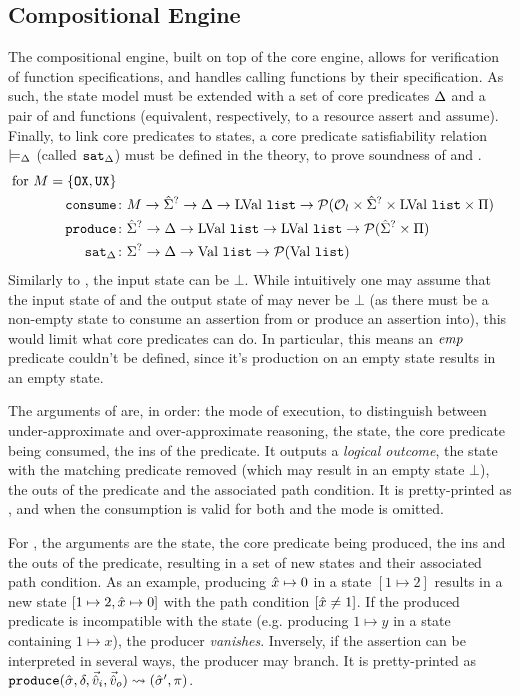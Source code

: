 \subsection{Compositional Engine}

The compositional engine, built on top of the core engine, allows for verification of function specifications, and handles calling functions by their specification. As such, the state model must be extended with a set of core predicates $\Delta$ and a pair of \consume{} and \produce{} functions (equivalent, respectively, to a resource assert and assume). Finally, to link core predicates to states, a core predicate satisfiability relation $\models_{\Delta}$ (called $\texttt{sat}_{\Delta}$) must be defined in the theory, to prove soundness of \consume{} and \produce.
\begin{align*}
	\text{for }M=\{\texttt{OX}, \texttt{UX}\}\\
	\texttt{consume} &\colon M\rightarrow \hat{\Sigma}^? \rightarrow \Delta \rightarrow \text{LVal}~\texttt{list} \rightarrow {\cal P}({\cal O}_l \times \hat{\Sigma}^? \times \text{LVal}~\texttt{list} \times \Pi) \\
	\texttt{produce} &\colon \hat{\Sigma}^? \rightarrow \Delta \rightarrow \text{LVal}~\texttt{list} \rightarrow \text{LVal}~\texttt{list} \rightarrow {\cal P}(\hat{\Sigma}^? \times \Pi)\\
	\texttt{sat}_\Delta &\colon\Sigma^? \rightarrow \Delta \rightarrow \text{Val}~\texttt{list} \rightarrow {\cal P}(\text{Val}~\texttt{list})
\end{align*}
Similarly to \execac, the input state can be $\bot$. While intuitively one may assume that the input state of \consume{} and the output state of \produce{} may never be $\bot$ (as there must be a non-empty state to consume an assertion from or produce an assertion into), this would limit what core predicates can do. In particular, this means an $\textit{emp}$ predicate couldn't be defined, since it's production on an empty state results in an empty state.

The arguments of \consume{} are, in order: the mode of execution, to distinguish between under-approximate and over-approximate reasoning, the state, the core predicate being consumed, the ins of the predicate. It outputs a \emph{logical outcome}, the state with the matching predicate removed (which may result in an empty state $\bot$), the outs of the predicate and the associated path condition. It is pretty-printed as , and when the consumption is valid for both \OX{} and \UX{} the mode is omitted.

For \produce{}, the arguments are the state, the core predicate being produced, the ins and the outs of the predicate, resulting in a set of new states and their associated path condition. As an example, producing $\hat{x} \mapsto 0$ in a state $[1 \mapsto 2]$ results in a new state $[1\mapsto 2, \hat{x} \mapsto 0]$ with the path condition $[\hat{x} \neq 1]$. If the produced predicate is incompatible with the state (e.g. producing $1 \mapsto y$ in a state containing $1 \mapsto x$), the producer \emph{vanishes}. Inversely, if the assertion can be interpreted in several ways, the producer may branch. It is pretty-printed as $\texttt{produce}(\hat{\sigma},\delta,\vec{\hat{v}}_i,\vec{\hat{v}}_o)\rightsquigarrow (\hat{\sigma}', \pi)$.

